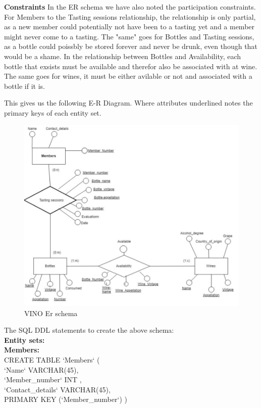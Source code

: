 \documentclass{article}
\theoremstyle{remark}
\numberwithin{equation}{section}
\begin{document}
	\textbf{Constraints} In the ER schema we have also noted the participation constraints. For Members to the Tasting sessions relationship, the relationship is only partial, as a new member could potentially not have been to a tasting yet and a member might never come to a tasting. The "same" goes for Bottles and Tasting sessions, as a bottle could poissbly be stored forever and never be drunk, even though that would be a shame. In the relationship between Bottles and Availability, each bottle that exsists must be available and therefor also be associated with at wine. The same goes for wines, it must be either avilable or not and associated with a bottle if it is.   
	
	This gives us the following E-R Diagram. Where attributes underlined notes the primary keys of each entity set. 

	\begin{figure}
		\includegraphics[width=\linewidth]{ERschema4.jpg}
		\caption{VINO Er schema}
		\label{fig:schema}
	\end{figure}

\newpage

	
	  
	  The SQL DDL statements to create the above schema: \\
	 \textbf{ Entity sets:}\\
	   
	  
	 \textbf{ Members:} \\
	  CREATE  TABLE `Members` (\\
	  `Name` VARCHAR(45),\\
	  `Member\_number` INT ,\\
	  `Contact\_details` VARCHAR(45),\\
	  PRIMARY KEY (`Member\_number`) )\\
	  
\end{document}
